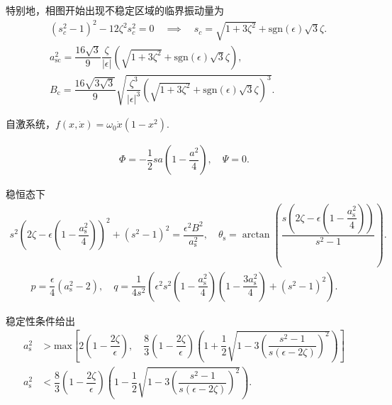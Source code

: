 \begin{exbox}
	特别地，相图开始出现不稳定区域的临界振动量为
	\begin{align*}
		&(s_c^2 - 1)^2 - 12 \zeta^2 s_c^2 = 0\quad \implies\quad s_c = \sqrt{1 + 3 \zeta^2} + \text{sgn}(\epsilon) \sqrt{3} \zeta.\\
		&a_{\mathrm{sc}}^2 = \dfrac{16 \sqrt{3}}{9} \dfrac{\zeta}{|\epsilon|} \left( \sqrt{1 + 3 \zeta^2} + \text{sgn}(\epsilon) \sqrt{3} \zeta \right),\\
		&B_{\mathrm{c}} = \dfrac{16 \sqrt{3 \sqrt{3}}}{9} \sqrt{\dfrac{\zeta^3}{|\epsilon|^3} \left( \sqrt{1 + 3 \zeta^2} + \text{sgn}(\epsilon) \sqrt{3} \zeta \right)^3}.
	\end{align*}
\end{exbox}

\begin{exbox}
	自激系统，\(f(x, \dot{x}) = \omega_0 \dot{x} (1 - x^2)\).

	\begin{align*}
		\Phi = -\dfrac{1}{2} s a \left( 1 - \dfrac{a^2}{4} \right), \quad \Psi = 0.
	\end{align*}

	稳恒态下
	\begin{align*}
		s^2 \left( 2 \zeta - \epsilon \left( 1 - \dfrac{a_{\mathrm{s}}^2}{4} \right) \right)^2 + (s^2 - 1)^2 = \dfrac{\epsilon^2 B^2}{a_{\mathrm{s}}^2}, \quad \theta_{\mathrm{s}} = \arctan\left( \dfrac{s \left( 2 \zeta - \epsilon \left( 1 - \dfrac{a_{\mathrm{s}}^2}{4} \right) \right)}{s^2 - 1} \right).
	\end{align*}
	\begin{align*}
		p = \dfrac{\epsilon}{4} (a_{\mathrm{s}}^2 - 2), \quad q = \dfrac{1}{4 s^2} \left( \epsilon^2 s^2 \left( 1 - \dfrac{a_{\mathrm{s}}^2}{4} \right) \left( 1 - \dfrac{3 a_{\mathrm{s}}^2}{4} \right) + (s^2 - 1)^2 \right).
	\end{align*}

	稳定性条件给出
	\begin{align*}
		a_{\mathrm{s}}^2 &> \text{max}\left[2 \left( 1 - \dfrac{2 \zeta}{\epsilon} \right),\quad\dfrac{8}{3} \left( 1 - \dfrac{2 \zeta}{\epsilon} \right) \left( 1 + \dfrac{1}{2} \sqrt{1 - 3 \left( \dfrac{s^2 - 1}{s (\epsilon - 2 \zeta)} \right)^2} \right)
			\right]\\
		a_{\mathrm{s}}^2 &< \dfrac{8}{3} \left( 1 - \dfrac{2 \zeta}{\epsilon} \right) \left( 1 - \dfrac{1}{2} \sqrt{1 - 3 \left( \dfrac{s^2 - 1}{s (\epsilon - 2 \zeta)} \right)^2} \right).
	\end{align*}
\end{exbox}

